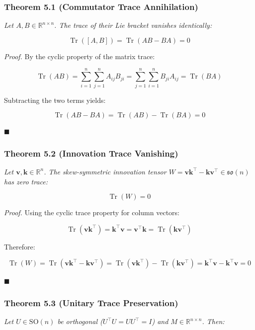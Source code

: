 \documentclass[11pt,twoside,openright]{amsbook}
\begin{document}
{{{{{{{\subsubsection{Theorem 5.1 (Commutator Trace Annihilation)}
\textit{Let $A, B \in \mathbb{R}^{n \times n}$. The trace of their Lie bracket vanishes identically:}

$$\operatorname{Tr}([A, B]) = \operatorname{Tr}(AB - BA) = 0$$

\textit{Proof.}  
By the cyclic property of the matrix trace:

$$\operatorname{Tr}(AB) = \sum_{i=1}^n \sum_{j=1}^n A_{ij} B_{ji} = \sum_{j=1}^n \sum_{i=1}^n B_{ji} A_{ij} = \operatorname{Tr}(BA)$$

Subtracting the two terms yields:

$$\operatorname{Tr}(AB - BA) = \operatorname{Tr}(AB) - \operatorname{Tr}(BA) = 0$$

$\blacksquare$

\subsubsection{Theorem 5.2 (Innovation Trace Vanishing)}
\textit{Let $\mathbf{v}, \mathbf{k} \in \mathbb{R}^{n}$. The skew-symmetric innovation tensor $W = \mathbf{v} \mathbf{k}^\top - \mathbf{k} \mathbf{v}^\top \in \mathfrak{so}(n)$ has zero trace:}

$$\operatorname{Tr}(W) = 0$$

\textit{Proof.}  
Using the cyclic trace property for column vectors:

$$\operatorname{Tr}(\mathbf{v} \mathbf{k}^\top) = \mathbf{k}^\top \mathbf{v} = \mathbf{v}^\top \mathbf{k} = \operatorname{Tr}(\mathbf{k} \mathbf{v}^\top)$$

Therefore:

$$\operatorname{Tr}(W) = \operatorname{Tr}(\mathbf{v} \mathbf{k}^\top - \mathbf{k} \mathbf{v}^\top) = \operatorname{Tr}(\mathbf{v} \mathbf{k}^\top) - \operatorname{Tr}(\mathbf{k} \mathbf{v}^\top) = \mathbf{k}^\top \mathbf{v} - \mathbf{k}^\top \mathbf{v} = 0$$

$\blacksquare$

\subsubsection{Theorem 5.3 (Unitary Trace Preservation)}
\textit{Let $U \in \mathrm{SO}(n)$ be orthogonal ($U^\top U = U U^\top = I$) and $M \in \mathbb{R}^{n \times n}$. Then:}

}}}}}}}
\end{document}

